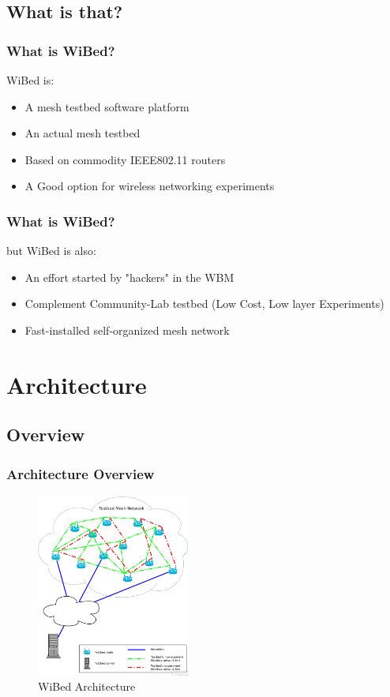 \documentclass[usepdftitle=false,13pt]{beamer}
\begin{document}
\subsection{What is that?}

\begin{frame}\frametitle{What is WiBed?}

	WiBed is:
	\begin{itemize}
		\item A mesh testbed software platform 
		\item An actual mesh testbed
		\item Based on commodity IEEE802.11 routers
		\item A Good option for wireless networking experiments
	\end{itemize}

\end{frame}


\begin{frame}\frametitle{What is WiBed?}

	but WiBed is also:
	\begin{itemize}
		\item An effort started by "hackers" in the WBM
		\item Complement Community-Lab testbed (Low Cost, Low layer Experiments)
		\item Fast-installed self-organized mesh network
	\end{itemize}

\end{frame}

\section{Architecture}
\subsection{Overview}
\begin{frame}\frametitle{Architecture Overview}

\begin{figure}[h!]
\begin{center}
\includegraphics[width=0.45\textwidth]{pic/wibed_arch}
\caption{WiBed Architecture}
\label{fig:wmn}
\end{center}
\end{figure}

\end{frame}
\end{document}
